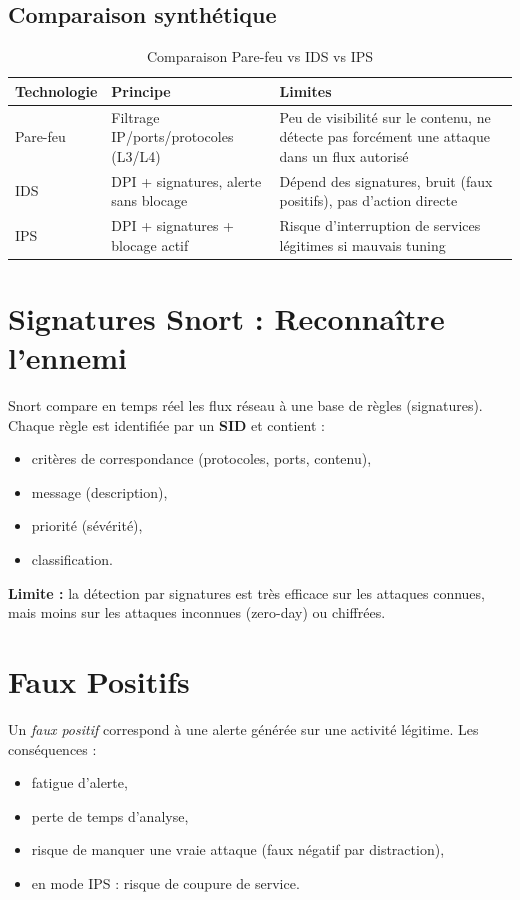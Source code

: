 \documentclass[12pt,a4paper,openany]{report}
\newcommand{\tableheadcolor}{\rowcolor{tableheadbg}}
\begin{document}
	\subsection{Comparaison synthétique}
	\begin{table}[H]
		\centering
		\renewcommand{\arraystretch}{1.5}
		\setlength{\arrayrulewidth}{0.5pt}
		\begin{tabular}{p{3cm} p{5.3cm} p{5.3cm}}
			\arrayrulecolor{tableborder}
			\hline
			\tableheadcolor
			\textcolor{tableheadfg}{\textbf{Technologie}} &
			\textcolor{tableheadfg}{\textbf{Principe}} &
			\textcolor{tableheadfg}{\textbf{Limites}} \\
			\hline
			\rowcolor{tablerowalt}
			Pare-feu &
			Filtrage IP/ports/protocoles (L3/L4) &
			Peu de visibilité sur le contenu, ne détecte pas forcément une attaque dans un flux autorisé \\
			IDS &
			DPI + signatures, alerte sans blocage &
			Dépend des signatures, bruit (faux positifs), pas d'action directe \\
			\rowcolor{tablerowalt}
			IPS &
			DPI + signatures + blocage actif &
			Risque d'interruption de services légitimes si mauvais tuning \\
			\hline
		\end{tabular}
		\caption{Comparaison Pare-feu vs IDS vs IPS}
		\label{tab:fw-ids-ips}
	\end{table}
	
	\section{Signatures Snort : Reconnaître l'ennemi}
	
	Snort compare en temps réel les flux réseau à une base de règles (signatures). Chaque règle est identifiée par un \textbf{SID} et contient :
	\begin{itemize}
		\item critères de correspondance (protocoles, ports, contenu),
		\item message (description),
		\item priorité (sévérité),
		\item classification.
	\end{itemize}
	
	\textbf{Limite :} la détection par signatures est très efficace sur les attaques connues, mais moins sur les attaques inconnues (zero-day) ou chiffrées.
	
	\section{Faux Positifs}
	Un \textit{faux positif} correspond à une alerte générée sur une activité légitime. Les conséquences :
	\begin{itemize}
		\item fatigue d'alerte,
		\item perte de temps d'analyse,
		\item risque de manquer une vraie attaque (faux négatif par distraction),
		\item en mode IPS : risque de coupure de service.
	\end{itemize}
	
\end{document}
